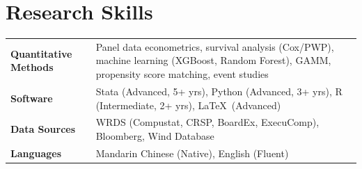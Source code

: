 \section{Research Skills}
\begin{tabularx}{\linewidth}{@{}l X@{}}
\textbf{Quantitative Methods} & Panel data econometrics, survival analysis (Cox/PWP), machine learning (XGBoost, Random Forest), GAMM, propensity score matching, event studies \\
\textbf{Software} & Stata (Advanced, 5+ yrs), Python (Advanced, 3+ yrs), R (Intermediate, 2+ yrs), \LaTeX\ (Advanced) \\
\textbf{Data Sources} & WRDS (Compustat, CRSP, BoardEx, ExecuComp), Bloomberg, Wind Database \\
\textbf{Languages} & Mandarin Chinese (Native), English (Fluent) \\
\end{tabularx}
